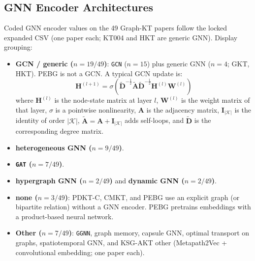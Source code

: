 \documentclass[lettersize,journal]{IEEEtran}
\begin{document}
\subsection{GNN Encoder Architectures}
Coded GNN encoder values on the 49 Graph-KT papers follow the locked expanded CSV (one paper each; KT004 and HKT are generic GNN). Display grouping:
\begin{itemize}
    \item \textbf{GCN / generic ($n=19/49$)}: \texttt{GCN} ($n=15$) plus generic GNN ($n=4$; GKT, HKT). PEBG is not a GCN. A typical GCN update is:
    \begin{equation}
    \mathbf{H}^{(l+1)} = \sigma\left(\tilde{\mathbf{D}}^{-\frac{1}{2}} \tilde{\mathbf{A}} \tilde{\mathbf{D}}^{-\frac{1}{2}} \mathbf{H}^{(l)} \mathbf{W}^{(l)}\right)
    \end{equation}
    where $\mathbf{H}^{(l)}$ is the node-state matrix at layer $l$, $\mathbf{W}^{(l)}$ is the weight matrix of that layer, $\sigma$ is a pointwise nonlinearity, $\mathbf{A}$ is the adjacency matrix, $\mathbf{I}_{|\mathcal{K}|}$ is the identity of order $|\mathcal{K}|$, $\tilde{\mathbf{A}} = \mathbf{A} + \mathbf{I}_{|\mathcal{K}|}$ adds self-loops, and $\tilde{\mathbf{D}}$ is the corresponding degree matrix.
    \item \textbf{heterogeneous GNN ($n=9/49$)}.
    \item \textbf{\texttt{GAT} ($n=7/49$)}.
    \item \textbf{hypergraph GNN ($n=2/49$)} and \textbf{dynamic GNN ($n=2/49$)}.
    \item \textbf{none ($n=3/49$)}: PDKT-C, CMKT, and PEBG use an explicit graph (or bipartite relation) without a GNN encoder. PEBG pretrains embeddings with a product-based neural network.
    \item \textbf{Other ($n=7/49$)}: \texttt{GGNN}, graph memory, capsule GNN, optimal transport on graphs, spatiotemporal GNN, and KSG-AKT other (Metapath2Vec + convolutional embedding; one paper each).
\end{itemize}
\end{document}
